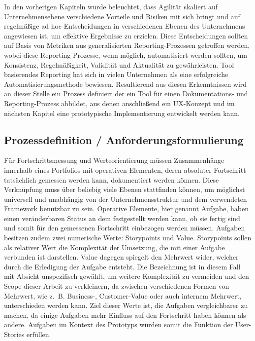 In den vorherigen Kapiteln wurde beleuchtet, dass Agilität skaliert auf Unternehmensebene verschiedene Vorteile und  Risiken mit sich bringt und auf regelmäßige ad hoc Entscheidungen in verschiedenen Ebenen des Unternehmens angewiesen ist, um effektive Ergebnisse zu erzielen. Diese Entscheidungen sollten auf Basis von Metriken aus generalisierten Reporting-Prozessen getroffen werden, wobei diese Reporting-Prozesse, wenn möglich, automatisiert werden sollten, um Konsistenz, Regelmäßigkeit, Validität und Aktualität zu gewährleisten. Tool basierendes Reporting hat sich in vielen Unternehmen als eine erfolgreiche Automatisierungsmethode bewiesen.
Resultierend aus diesen Erkenntnissen wird an dieser Stelle ein Prozess definiert der ein Tool für einen Dokumentations- und Reporting-Prozess abbildet, aus denen anschließend ein UX-Konzept und im nächsten Kapitel eine prototypische Implementierung entwickelt werden kann.

\subsection{Prozessdefinition / Anforderungsformulierung}
Für Fortschrittsmessung und Werteorientierung müssen Zusammenhänge innerhalb eines Portfolios mit operativen Elementen, deren absoluter Fortschritt tatsächlich gemessen werden kann, dokumentiert werden können. Diese Verknüpfung muss über beliebig viele Ebenen stattfinden können, um möglichst universell und unabhängig von der Unternehmensstruktur und dem verwendeten Framework benutzbar zu sein.
Operative Elemente, hier genannt Aufgabe, haben einen veränderbaren Status an dem festgestellt werden kann, ob sie fertig sind und somit für den gemessenen Fortschritt einbezogen werden müssen. Aufgaben besitzen zudem zwei numerische Werte: Storypoints und Value. Storypoints sollen als relativer Wert die Komplexität der Umsetzung, die mit einer Aufgabe verbunden ist darstellen. Value dagegen spiegelt den Mehrwert wider, welcher durch die Erledigung der Aufgabe entsteht. Die Bezeichnung ist in diesem Fall mit Absicht unspezifisch gewählt, um weitere Komplexität zu vermeiden und den Scope dieser Arbeit zu verkleinern, da zwischen verschiedenen Formen von Mehrwert, wie z. B. Business-, Customer-Value oder auch internem Mehrwert, unterschieden werden kann. Ziel dieser Werte ist, die Aufgaben vergleichbarer zu machen, da einige Aufgaben mehr Einfluss auf den Fortschritt haben können als andere. Aufgaben im Kontext des Prototyps würden somit die Funktion der User-Stories erfüllen.

